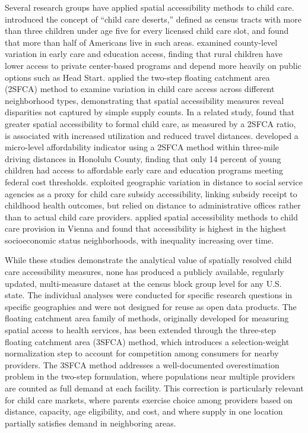 \documentclass{CUP-JNL-DAP}%
\begin{document}
Several research groups have applied spatial accessibility methods to child care. \citet{malik2017} introduced the concept of ``child care deserts,'' defined as census tracts with more than three children under age five for every licensed child care slot, and found that more than half of Americans live in such areas. \citet{morrissey2022} examined county-level variation in early care and education access, finding that rural children have lower access to private center-based programs and depend more heavily on public options such as Head Start. \citet{blumenberg2023a} applied the two-step floating catchment area (2SFCA) method to examine variation in child care access across different neighborhood types, demonstrating that spatial accessibility measures reveal disparities not captured by simple supply counts. In a related study, \citet{blumenberg2024} found that greater spatial accessibility to formal child care, as measured by a 2SFCA ratio, is associated with increased utilization and reduced travel distances. \citet{azuma2023} developed a micro-level affordability indicator using a 2SFCA method within three-mile driving distances in Honolulu County, finding that only 14 percent of young children had access to affordable early care and education programs meeting federal cost thresholds. \citet{herbst2012} exploited geographic variation in distance to social service agencies as a proxy for child care subsidy accessibility, linking subsidy receipt to childhood health outcomes, but relied on distance to administrative offices rather than to actual child care providers. \citet{pennerstorfer2021} applied spatial accessibility methods to child care provision in Vienna and found that accessibility is highest in the highest socioeconomic status neighborhoods, with inequality increasing over time.

While these studies demonstrate the analytical value of spatially resolved child care accessibility measures, none has produced a publicly available, regularly updated, multi-measure dataset at the census block group level for any U.S. state. The individual analyses were conducted for specific research questions in specific geographies and were not designed for reuse as open data products. The floating catchment area family of methods, originally developed for measuring spatial access to health services\citep{luo2003,luo2009}, has been extended through the three-step floating catchment area (3SFCA) method, which introduces a selection-weight normalization step to account for competition among consumers for nearby providers\citep{wan2012}. The 3SFCA method addresses a well-documented overestimation problem in the two-step formulation, where populations near multiple providers are counted as full demand at each facility. This correction is particularly relevant for child care markets, where parents exercise choice among providers based on distance, capacity, age eligibility, and cost, and where supply in one location partially satisfies demand in neighboring areas.
\end{document}
